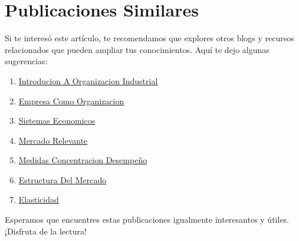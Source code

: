 \documentclass[
  man,
  floatsintext,
  longtable,
  a4paper,
  nolmodern,
  notxfonts,
  notimes,
  colorlinks=true,linkcolor=blue,citecolor=blue,urlcolor=blue]{apa7}
\providecommand{\tightlist}{%
  \setlength{\itemsep}{0pt}\setlength{\parskip}{0pt}}
\begin{document}
\section{Publicaciones Similares}\label{publicaciones-similares}

Si te interesó este artículo, te recomendamos que explores otros blogs y
recursos relacionados que pueden ampliar tus conocimientos. Aquí te dejo
algunas sugerencias:

\begin{enumerate}
\def\labelenumi{\arabic{enumi}.}
\tightlist
\item
  \href{https://achalmaedison.netlify.app/microeconomia/organizacion-industrial/2023-06-12-introducion-a-organizacion-industrial/index.pdf}{}
  \href{https://achalmaedison.netlify.app/microeconomia/organizacion-industrial/2023-06-12-introducion-a-organizacion-industrial}{Introducion
  A Organizacion Industrial}
\item
  \href{https://achalmaedison.netlify.app/microeconomia/organizacion-industrial/2023-06-13-empresa-como-organizacion/index.pdf}{}
  \href{https://achalmaedison.netlify.app/microeconomia/organizacion-industrial/2023-06-13-empresa-como-organizacion}{Empresa
  Como Organizacion}
\item
  \href{https://achalmaedison.netlify.app/microeconomia/organizacion-industrial/2023-06-13-sistemas-economicos/index.pdf}{}
  \href{https://achalmaedison.netlify.app/microeconomia/organizacion-industrial/2023-06-13-sistemas-economicos}{Sistemas
  Economicos}
\item
  \href{https://achalmaedison.netlify.app/microeconomia/organizacion-industrial/2023-06-15-mercado-relevante/index.pdf}{}
  \href{https://achalmaedison.netlify.app/microeconomia/organizacion-industrial/2023-06-15-mercado-relevante}{Mercado
  Relevante}
\item
  \href{https://achalmaedison.netlify.app/microeconomia/organizacion-industrial/2023-06-16-medidas-concentracion-desempeño/index.pdf}{}
  \href{https://achalmaedison.netlify.app/microeconomia/organizacion-industrial/2023-06-16-medidas-concentracion-desempeño}{Medidas
  Concentracion Desempeño}
\item
  \href{https://achalmaedison.netlify.app/microeconomia/organizacion-industrial/2023-06-17-estructura-del-mercado/index.pdf}{}
  \href{https://achalmaedison.netlify.app/microeconomia/organizacion-industrial/2023-06-17-estructura-del-mercado}{Estructura
  Del Mercado}
\item
  \href{https://achalmaedison.netlify.app/microeconomia/organizacion-industrial/2023-06-23-elasticidad/index.pdf}{}
  \href{https://achalmaedison.netlify.app/microeconomia/organizacion-industrial/2023-06-23-elasticidad}{Elasticidad}
\end{enumerate}

Esperamos que encuentres estas publicaciones igualmente interesantes y
útiles. ¡Disfruta de la lectura!
\end{document}
